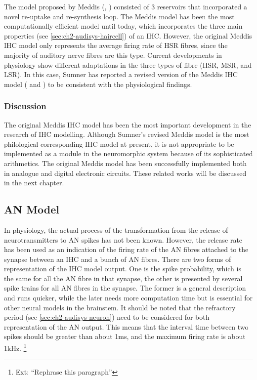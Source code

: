 \documentclass[11pt]{article}
\begin{document}
The model proposed by Meddis (\cite{Meddis1986}, \cite{Meddis1988})
consisted of 3 reservoirs that incorporated a novel re-uptake and
re-synthesis loop. The Meddis model has been the most computationally
efficient model until today, which incorporates the three main
properties (see \ref{sec:ch2-audisys-haircell}) of an IHC.
However, the original Meddis IHC model only represents the average
firing rate of HSR fibres, since the majority of auditory nerve fibres
are this type. Current developments in physiology show different
adaptations in the three types of fibre (HSR, MSR, and LSR). In this
case, Sumner has reported a revised version of the Meddis IHC model
(\cite{Sumner2002} and \cite{Sumner2003a}) to be consistent with the
physiological findings.
\subsubsection{Discussion}
\label{sec-3-4-4}
\label{sec:ch2-discussion2}

The original Meddis IHC model has been the most important development
in the research of IHC modelling. Although Sumner's revised Meddis
model is the most philological corresponding IHC model at present, it
is not appropriate to be implemented as a module in the neuromorphic
system because of its sophisticated arithmetics. The original Meddis
model has been successfully implemented both in analogue and digital
electronic circuits. These related works will be discussed in the next
chapter.
\subsection{AN Model}
\label{sec-3-5}
\label{sec:ch2-an-model}

In physiology, the actual process of the transformation from the
release of neurotransmitters to AN spikes has not been known. However,
the release rate has been used as an indication of the firing rate of the
AN fibres attached to the synapse between an IHC and a bunch of AN
fibres. There are two forms of representation of the IHC model output.
One is the spike probability, which is the same for all the AN fibre
in that synapse, the other is presented by several spike trains for
all AN fibres in the synapse. The former is a general description and
runs quicker, while the later needs more computation time but is
essential for other neural models in the brainstem. It should be noted
that the refractory period (see \ref{sec:ch2-audisys-neuron})
need to be considered for both representation of the AN output. This
means that the interval time between two spikes should be greater than
about 1ms, and the maximum firing rate is about 1kHz. \footnote{Ext: ``Rephrase this paragraph'' }
\end{document}
